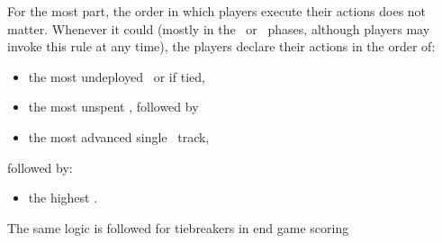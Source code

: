 For the most part, the order in which players execute their actions does not 
matter.  Whenever it could (mostly in the \diplomacy\ or \deployment\ phases, 
although players may invoke this rule at any time), the players declare their 
actions in the order of:
\begin{itemize}
  \item the most undeployed \squadrons\, or if tied,
  \item the most unspent \currency, followed by
  \item the most advanced single \tech\ track,
\end{itemize}
followed by:
\begin{itemize}
  \item the highest \population.
\end{itemize}
The same logic is followed for tiebreakers in end game scoring
